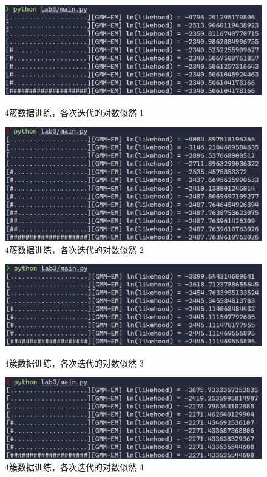 \begin{figure}[htbp]
    \begin{minipage}[t]{0.5\linewidth}
        \centering
        \includegraphics[width=\textwidth]{figures/Figure_15.png}
        \caption{$4$簇数据训练，各次迭代的对数似然 1}
    \end{minipage}
    \begin{minipage}[t]{0.5\linewidth}
        \centering
        \includegraphics[width=\textwidth]{figures/Figure_16.png}
        \caption{$4$簇数据训练，各次迭代的对数似然 2}
    \end{minipage}
\end{figure}
\begin{figure}[htbp]
    \begin{minipage}[t]{0.5\linewidth}
        \centering
        \includegraphics[width=\textwidth]{figures/Figure_17.png}
        \caption{$4$簇数据训练，各次迭代的对数似然 3}
    \end{minipage}
    \begin{minipage}[t]{0.5\linewidth}
        \centering
        \includegraphics[width=\textwidth]{figures/Figure_18.png}
        \caption{$4$簇数据训练，各次迭代的对数似然 4}
    \end{minipage}
\end{figure}

